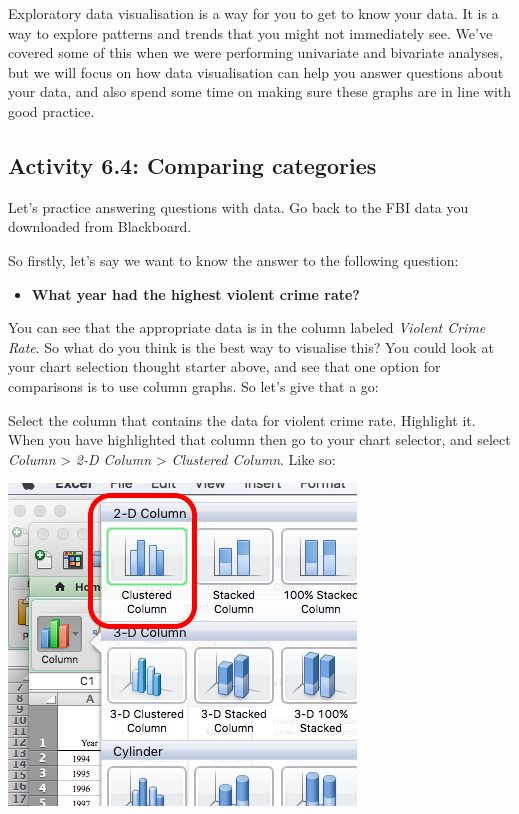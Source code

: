 \documentclass[
]{book}
\providecommand{\tightlist}{%
  \setlength{\itemsep}{0pt}\setlength{\parskip}{0pt}}
\begin{document}
Exploratory data visualisation is a way for you to get to know your data. It is a way to explore patterns and trends that you might not immediately see. We've covered some of this when we were performing univariate and bivariate analyses, but we will focus on how data visualisation can help you answer questions about your data, and also spend some time on making sure these graphs are in line with good practice.

\hypertarget{activity-6.4-comparing-categories}{%
\subsection{Activity 6.4: Comparing categories}\label{activity-6.4-comparing-categories}}

Let's practice answering questions with data. Go back to the FBI data you downloaded from Blackboard.

So firstly, let's say we want to know the answer to the following question:

\begin{itemize}
\tightlist
\item
  \textbf{What year had the highest violent crime rate?}
\end{itemize}

You can see that the appropriate data is in the column labeled \emph{Violent Crime Rate}. So what do you think is the best way to visualise this? You could look at your chart selection thought starter above, and see that one option for comparisons is to use column graphs. So let's give that a go:

Select the column that contains the data for violent crime rate. Highlight it. When you have highlighted that column then go to your chart selector, and select \emph{Column} \textgreater{} \emph{2-D Column} \textgreater{} \emph{Clustered Column}. Like so:

\includegraphics{imgs/desc_viz_1.png}
\end{document}
